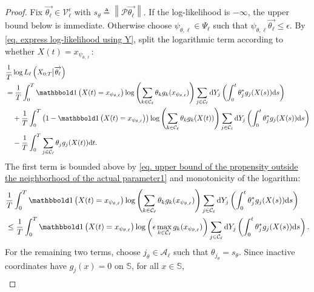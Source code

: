\documentclass[pdflatex,sn-mathphys-num]{sn-jnl}%
\def\dd{\text{d}}
\theoremstyle{thmstyleone}%
\theoremstyle{thmstyletwo}%
\theoremstyle{thmstylethree}%
\begin{document}
\begin{appendices}
\begin{proof}
    Fix $\overrightarrow{\theta_\ell}\in\mathcal V_\ell^\epsilon$ with $s_\theta\triangleq\left\|\mathcal P\overrightarrow{\theta_\ell}\right\|$.
    If the log-likelihood is $-\infty$, the upper bound below is immediate.
    Otherwise choose $\psi_{\theta,\ell}\in\Psi_\ell$ such that $\psi_{\theta,\ell}\overrightarrow{\theta_\ell}\leq\epsilon$.
    By \eqref{eq. express log-likelihood using Y}, split the logarithmic term according to whether $X(t)=x_{\psi_{\theta,\ell}}$:
    \begin{align*}
        &\frac{1}{T}\log L_\ell\left(X_{0:T}\big|\overrightarrow{\theta_\ell}\right)\\
        &=\frac{1}{T}\int_0^T
        \mathbbold 1\left(X(t)=x_{\psi_{\theta,\ell}}\right)
        \log\left(\sum_{k\in\mathcal C_\ell}\theta_k g_k(x_{\psi_{\theta,\ell}})\right)
        \sum_{j\in\mathcal C_\ell}
        \dd Y_j\left(\int_0^t\theta_j^*g_j(X(s))\dd s\right)\\
        &\quad+
        \frac{1}{T}\int_0^T
        \left(1-\mathbbold 1\left(X(t)=x_{\psi_{\theta,\ell}}\right)\right)
        \log\left(\sum_{k\in\mathcal C_\ell}\theta_k g_k(X(t))\right)
        \sum_{j\in\mathcal C_\ell}
        \dd Y_j\left(\int_0^t\theta_j^*g_j(X(s))\dd s\right)\\
        &\quad-
        \frac{1}{T}\int_0^T\sum_{j\in\mathcal C_\ell}\theta_jg_j(X(t))\dd t.
    \end{align*}
    The first term is bounded above by \eqref{eq. upper bound of the propensity outside the neighborhood of the actual parameter1} and monotonicity of the logarithm:
    \begin{align*}
        &\frac{1}{T}\int_0^T
        \mathbbold 1\left(X(t)=x_{\psi_{\theta,\ell}}\right)
        \log\left(\sum_{k\in\mathcal C_\ell}\theta_k g_k(x_{\psi_{\theta,\ell}})\right)
        \sum_{j\in\mathcal C_\ell}
        \dd Y_j\left(\int_0^t\theta_j^*g_j(X(s))\dd s\right)\\
        &\leq
        \frac{1}{T}\int_0^T
        \mathbbold 1\left(X(t)=x_{\psi_{\theta,\ell}}\right)
        \log\left(\epsilon\max_{k\in\mathcal C_\ell}g_k(x_{\psi_{\theta,\ell}})\right)
        \sum_{j\in\mathcal C_\ell}
        \dd Y_j\left(\int_0^t\theta_j^*g_j(X(s))\dd s\right).
    \end{align*}
    For the remaining two terms, choose $j_\theta\in\mathcal A_\ell$ such that $\theta_{j_\theta}=s_\theta$.
    Since inactive coordinates have $g_j(x)=0$ on $\mathbb S$, for all $x\in\mathbb S$,
    \begin{align*}

\end{align*}
\end{proof}
\end{appendices}
\end{document}
